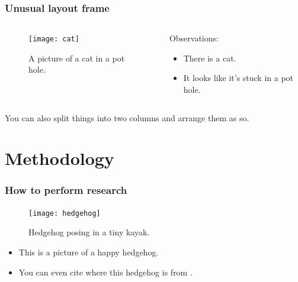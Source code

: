 \documentclass[10pt,xcolor=table]{beamer}
\begin{document}
\begin{frame}
  \frametitle{Unusual layout frame}
  \begin{columns}
    \begin{column}{.44\textwidth}
      \begin{figure}[t]
        \texttt{[image: cat]}
        \caption{A picture of a cat in a pot hole\footnotemark[1].}
      \end{figure}
    \end{column}
    \begin{column}{.60\textwidth}
      Observations:
        \begin{itemize}
        \item There is a cat.
        \item It looks like it's stuck in a pot hole.
        \end{itemize}
    \end{column}
  \end{columns}

  You can also split things into two columns and arrange them as so.
  
  \vspace{0.8cm}
\end{frame}

\section{Methodology}
\begin{frame}
  \frametitle{How to perform research}
  \begin{figure}
    \texttt{[image: hedgehog]}
    \caption{Hedgehog posing in a tiny kayak.}
  \end{figure}
  \vspace{-0.4cm}
  \begin{itemize}
  \item This is a picture of a happy hedgehog.
  \item You can even cite where this hedgehog is from .
  \end{itemize}
  \vspace{0.15cm}
\end{frame}
\end{document}
